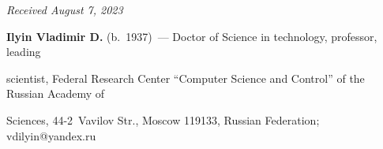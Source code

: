 \vspace*{-7pt}





\hfill{\small\textit{Received August 7, 2023}} 





\vspace*{-16pt} 





\Contrl





\vspace*{-4pt}





\noindent


\textbf{Ilyin Vladimir D.} (b.\ 1937)~--- Doctor of Science in technology, professor, leading 


scientist, Federal Research Center ``Computer Science and Control'' of the Russian Academy of 


Sciences, 44-2~Vavilov Str., Moscow 119133, Russian Federation; \mbox{vdilyin@yandex.ru}


  


\label{end\stat}





\renewcommand{\bibname}{\protect\rm Литература}    


